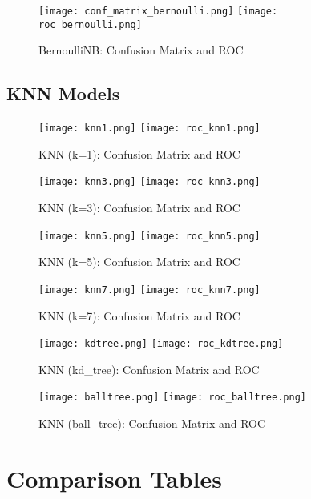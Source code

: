 \documentclass[12pt]{article}
\begin{document}
\begin{figure}[H]
\centering
\texttt{[image: conf\_matrix\_bernoulli.png]}
\texttt{[image: roc\_bernoulli.png]}
\caption{BernoulliNB: Confusion Matrix and ROC}
\end{figure}

\subsection*{KNN Models}

\begin{figure}[H]
\centering
\texttt{[image: knn1.png]}
\texttt{[image: roc\_knn1.png]}
\caption{KNN (k=1): Confusion Matrix and ROC}
\end{figure}

\begin{figure}[H]
\centering
\texttt{[image: knn3.png]}
\texttt{[image: roc\_knn3.png]}
\caption{KNN (k=3): Confusion Matrix and ROC}
\end{figure}

\begin{figure}[H]
\centering
\texttt{[image: knn5.png]}
\texttt{[image: roc\_knn5.png]}
\caption{KNN (k=5): Confusion Matrix and ROC}
\end{figure}

\begin{figure}[H]
\centering
\texttt{[image: knn7.png]}
\texttt{[image: roc\_knn7.png]}
\caption{KNN (k=7): Confusion Matrix and ROC}
\end{figure}

\begin{figure}[H]
\centering
\texttt{[image: kdtree.png]}
\texttt{[image: roc\_kdtree.png]}
\caption{KNN (kd\_tree): Confusion Matrix and ROC}
\end{figure}

\begin{figure}[H]
\centering
\texttt{[image: balltree.png]}
\texttt{[image: roc\_balltree.png]}
\caption{KNN (ball\_tree): Confusion Matrix and ROC}
\end{figure}

\section*{Comparison Tables}
\end{document}
